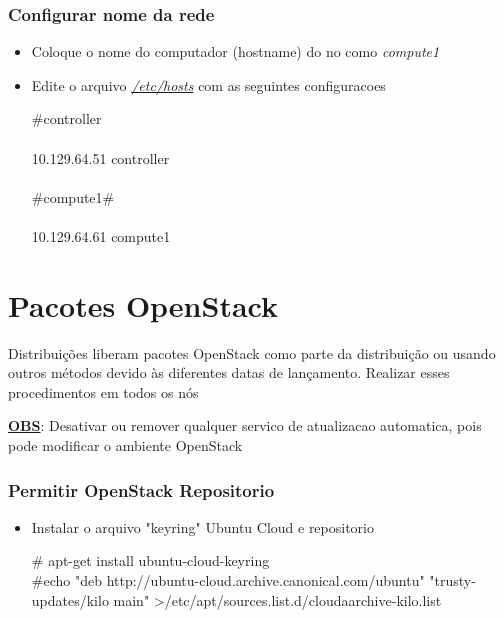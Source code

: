 \documentclass[a4paper]{book}
\begin{document}
				\subsubsection{Configurar nome da rede}
				\begin{itemize}
					\item Coloque o nome do computador (hostname) do no como \emph{compute1}
					\item Edite o arquivo \emph{\underline{/etc/hosts}} com as seguintes configuracoes
						\begin{snugshade}
						$\#$controller \\  \\
						10.129.64.51 		controller \\ \\
						$\#$compute1$\#$		\\ \\
						10.129.64.61		compute1\\
						\end{snugshade}
				
				\end{itemize}
				
				\section{Pacotes OpenStack}
				
				Distribuições liberam pacotes OpenStack como parte da distribuição ou usando outros métodos devido às diferentes datas de lançamento. Realizar esses procedimentos em todos os nós
				
				\underline{\textbf{OBS}}: Desativar ou remover qualquer servico de atualizacao automatica, pois pode modificar o ambiente OpenStack
				
				\subsubsection{Permitir OpenStack Repositorio}
				\begin{itemize}
					\item Instalar o arquivo "keyring" Ubuntu Cloud e repositorio
						\begin{snugshade}
						$\#$ apt-get install ubuntu-cloud-keyring \\ 
						$\#$echo \hspace*{0.2 mm} "deb http://ubuntu-cloud.archive.canonical.com/ubuntu" "trusty-updates/kilo main" \textgreater /etc/apt/sources.list.d/cloudaarchive-kilo.list 								\\ \\
						\end{snugshade}
				\end{itemize}
\end{document}
